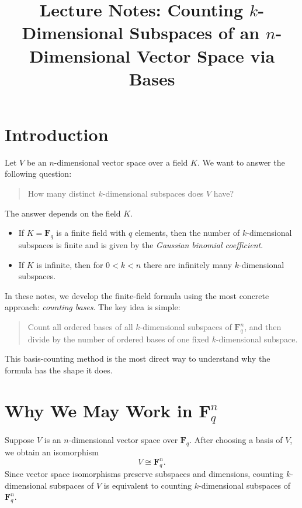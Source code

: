 \documentclass[11pt]{article}
\title{Lecture Notes: Counting \(k\)-Dimensional Subspaces of an \(n\)-Dimensional Vector Space via Bases}
\author{}
\date{}
\theoremstyle{definition}
\theoremstyle{remark}
\newcommand{\F}{\mathbf{F}}
\begin{document}
	
	\maketitle
	
	\tableofcontents
	
	\section{Introduction}
	
	Let \(V\) be an \(n\)-dimensional vector space over a field \(K\). We want to answer the following question:
	
	\begin{quote}
		How many distinct \(k\)-dimensional subspaces does \(V\) have?
	\end{quote}
	
	The answer depends on the field \(K\).
	
	\begin{itemize}
		\item If \(K=\F_q\) is a finite field with \(q\) elements, then the number of \(k\)-dimensional subspaces is finite and is given by the \emph{Gaussian binomial coefficient}.
		\item If \(K\) is infinite, then for \(0<k<n\) there are infinitely many \(k\)-dimensional subspaces.
	\end{itemize}
	
	In these notes, we develop the finite-field formula using the most concrete approach: \emph{counting bases}. The key idea is simple:
	
	\begin{quote}
		Count all ordered bases of all \(k\)-dimensional subspaces of \(\F_q^n\), and then divide by the number of ordered bases of one fixed \(k\)-dimensional subspace.
	\end{quote}
	
	This basis-counting method is the most direct way to understand why the formula has the shape it does.
	
	\section{Why We May Work in \(\F_q^n\)}
	
	Suppose \(V\) is an \(n\)-dimensional vector space over \(\F_q\). After choosing a basis of \(V\), we obtain an isomorphism
	\[
	V \cong \F_q^n.
	\]
	Since vector space isomorphisms preserve subspaces and dimensions, counting \(k\)-dimensional subspaces of \(V\) is equivalent to counting \(k\)-dimensional subspaces of \(\F_q^n\).
	
\end{document}
